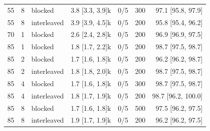\begin{table}[t]
\begin{tabular}{rrlrrrr}
55 & 8 & blocked & 3.8 [3.3, 3.9]k & 0/5 & 300 & 97.1 [95.8, 97.9] \\
55 & 8 & interleaved & 3.9 [3.9, 4.5]k & 0/5 & 200 & 95.8 [95.4, 96.2] \\
70 & 1 & blocked & 2.6 [2.4, 2.8]k & 0/5 & 200 & 96.9 [96.9, 97.5] \\
85 & 1 & blocked & 1.8 [1.7, 2.2]k & 0/5 & 200 & 98.7 [97.5, 98.7] \\
85 & 2 & blocked & 1.7 [1.6, 1.8]k & 0/5 & 200 & 96.2 [96.2, 98.7] \\
85 & 2 & interleaved & 1.8 [1.8, 2.0]k & 0/5 & 200 & 98.7 [97.5, 98.7] \\
85 & 4 & blocked & 1.7 [1.6, 1.8]k & 0/5 & 300 & 98.7 [97.5, 98.7] \\
85 & 4 & interleaved & 1.8 [1.7, 1.9]k & 0/5 & 200 & 98.7 [96.2, 100.0] \\
85 & 8 & blocked & 1.7 [1.6, 1.8]k & 0/5 & 500 & 97.5 [96.2, 97.5] \\
85 & 8 & interleaved & 1.9 [1.7, 1.9]k & 0/5 & 200 & 96.2 [96.2, 97.5] \\
\bottomrule
\end{tabular}
\end{table}
